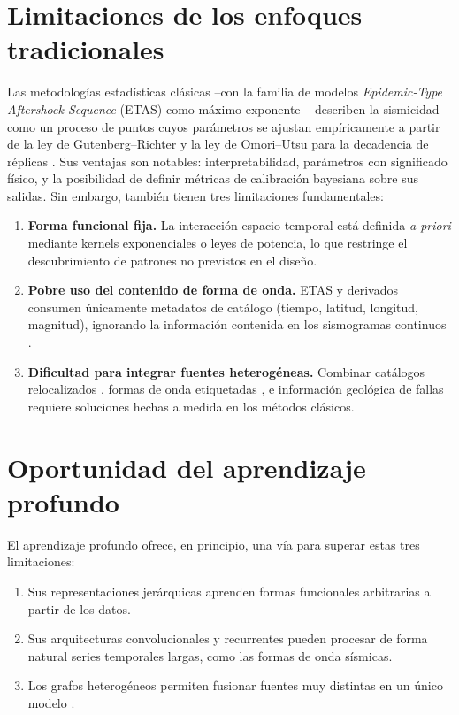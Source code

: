 \section{Limitaciones de los enfoques tradicionales}
\label{limitaciones-tradicionales}

Las metodologías estadísticas clásicas --con la familia de modelos \emph{Epidemic-Type Aftershock Sequence} (ETAS) como máximo exponente \citep{ogata1988etas, ogata1998spacetime}-- describen la sismicidad como un proceso de puntos cuyos parámetros se ajustan empíricamente a partir de la ley de Gutenberg--Richter \citep{gutenberg1944frequency} y la ley de Omori--Utsu para la decadencia de réplicas \citep{omori1894aftershocks, utsu1961statistical}. Sus ventajas son notables: interpretabilidad, parámetros con significado físico, y la posibilidad de definir métricas de calibración bayesiana sobre sus salidas. Sin embargo, también tienen tres limitaciones fundamentales:

\begin{enumerate}
  \item \textbf{Forma funcional fija.} La interacción espacio-temporal está definida \textit{a priori} mediante kernels exponenciales o leyes de potencia, lo que restringe el descubrimiento de patrones no previstos en el diseño.

  \item \textbf{Pobre uso del contenido de forma de onda.} ETAS y derivados consumen únicamente metadatos de catálogo (tiempo, latitud, longitud, magnitud), ignorando la información contenida en los sismogramas continuos \citep{beroza2021dlreview}.

  \item \textbf{Dificultad para integrar fuentes heterogéneas.} Combinar catálogos relocalizados \citep{hauksson2012relocated, waldhauser2008doubledifference}, formas de onda etiquetadas \citep{mousavi2019stead}, e información geológica de fallas requiere soluciones hechas a medida en los métodos clásicos.
\end{enumerate}

\section{Oportunidad del aprendizaje profundo}
\label{oportunidad-dl}

El aprendizaje profundo ofrece, en principio, una vía para superar estas tres limitaciones:

\begin{enumerate}
  \item Sus representaciones jerárquicas aprenden formas funcionales arbitrarias a partir de los datos.

  \item Sus arquitecturas convolucionales y recurrentes pueden procesar de forma natural series temporales largas, como las formas de onda sísmicas.

  \item Los grafos heterogéneos permiten fusionar fuentes muy distintas en un único modelo \citep{scarselli2009gnn, kipf2017gcn}.
\end{enumerate}

